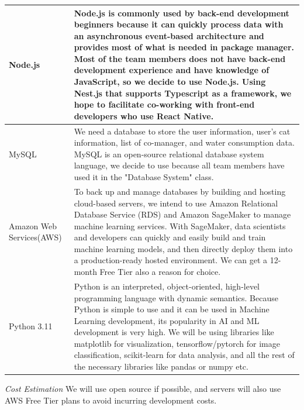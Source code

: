 \documentclass[conference]{IEEEtran}
\begin{document}
\begin{table}[!htbp]\normalsize
\begin{center}
\begin{tabular}{|p{1.8cm}|p{5.8cm}|}
\hline
Node.js & Node.js is commonly used by back-end development beginners because it can quickly process data with an asynchronous event-based architecture and provides most of what is needed in package manager. Most of the team members does not have back-end development experience and have knowledge of JavaScript, so we decide to use Node.js. Using Nest.js that supports Typescript as a framework, we hope to facilitate co-working with front-end developers who use React Native.
\\ \hline
MySQL & We need a database to store the user information, user's cat information, list of co-manager, and water consumption data. MySQL is an open-source relational database system language, we decide to use because all team members have used it in the "Database System" class.
\\ \hline
Amazon Web Services(AWS) & To back up and manage databases by building and hosting cloud-based servers, we intend to use Amazon Relational Database Service (RDS) and Amazon SageMaker to manage machine learning services. With SageMaker, data scientists and developers can quickly and easily build and train machine learning models, and then directly deploy them into a production-ready hosted environment. We can get a 12-month Free Tier also a reason for choice.
\\ \hline
Python 3.11 & Python is an interpreted, object-oriented, high-level programming language with dynamic semantics. Because Python is simple to use and it can be used in Machine Learning development, its popularity in AI and ML development is very high. We will be using libraries like matplotlib for visualization, tensorflow/pytorch for image classification, scikit-learn for data analysis, and all the rest of the necessary libraries like pandas or numpy etc.
\\ \hline
\end{tabular}
\label{tab1}
\end{center}
\end{table}
\textit{Cost Estimation}
\newline
We will use open source if possible, and servers will also use AWS Free Tier plans to avoid incurring development costs.
\newline
\end{document}
